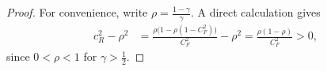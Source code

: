 \documentclass[12pt]{article}
\newcommand{\Var}{\mathrm{Var}}
\newcommand{\gam}{\gamma}
\begin{document}
\begin{proof} For convenience, write $\rho = \frac{1-\gam}{\gam}$.
	A direct calculation gives
\[
\begin{aligned}
c_R^2-\rho^2
&=
\frac{\rho\bigl(1-\rho(1-C_F^2)\bigr)}{C_F^2}
-\rho^2
=
\frac{\rho(1-\rho)}{C_F^2} >0,
\end{aligned}
\]
since $0<\rho<1$ for $\gam>\frac{1}{2}$.
\end{proof}

%
%

\end{document}
